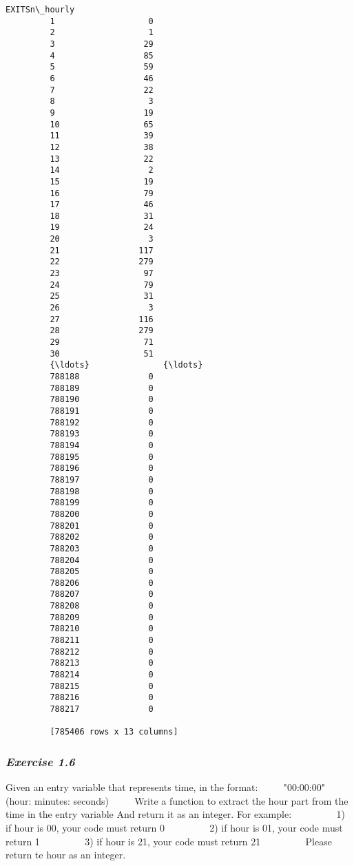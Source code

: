 \documentclass[11pt]{article}
\begin{document}
\begin{Verbatim}[commandchars=\\\{\}]
                 EXITSn\_hourly  
         1                   0  
         2                   1  
         3                  29  
         4                  85  
         5                  59  
         6                  46  
         7                  22  
         8                   3  
         9                  19  
         10                 65  
         11                 39  
         12                 38  
         13                 22  
         14                  2  
         15                 19  
         16                 79  
         17                 46  
         18                 31  
         19                 24  
         20                  3  
         21                117  
         22                279  
         23                 97  
         24                 79  
         25                 31  
         26                  3  
         27                116  
         28                279  
         29                 71  
         30                 51  
         {\ldots}               {\ldots}  
         788188              0  
         788189              0  
         788190              0  
         788191              0  
         788192              0  
         788193              0  
         788194              0  
         788195              0  
         788196              0  
         788197              0  
         788198              0  
         788199              0  
         788200              0  
         788201              0  
         788202              0  
         788203              0  
         788204              0  
         788205              0  
         788206              0  
         788207              0  
         788208              0  
         788209              0  
         788210              0  
         788211              0  
         788212              0  
         788213              0  
         788214              0  
         788215              0  
         788216              0  
         788217              0  
         
         [785406 rows x 13 columns]
\end{Verbatim}
            
    \subsubsection{\texorpdfstring{\emph{Exercise
1.6}}{Exercise 1.6}}\label{exercise-1.6}

Given an entry variable that represents time, in the format: ~~~~
"00:00:00" (hour: minutes: seconds) ~~~~ Write a function to extract the
hour part from the time in the entry variable And return it as an
integer. For example: ~~~~~~~~ 1) if hour is 00, your code must return 0
~~~~~~~~ 2) if hour is 01, your code must return 1 ~~~~~~~~ 3) if hour
is 21, your code must return 21 ~~~~~~~~ Please return te hour as an
integer.
\end{document}
